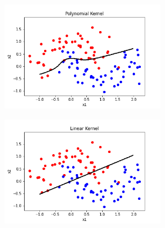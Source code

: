 \documentclass{beamer}
\begin{document}
\begin{frame}
\begin{columns}
\begin{column}{0.5\textwidth}
\begin{figure}
				\label{fig:reg-C}
			\end{figure}
		\end{column}
		\begin{column}{0.5\textwidth}
			\begin{figure}
				\centering
				\begin{subfigure}[h!]{1\textwidth}
					\centering
					\includegraphics[width=\linewidth]{fig10.png}
					\label{fig:svc-poly}
				\end{subfigure}
				\begin{subfigure}[h!]{1\textwidth}
					\centering
					\includegraphics[width=\linewidth]{fig11.png}
					\label{fig:svc-linear}
				\end{subfigure}
				\label{fig:kernel}
			\end{figure}
		\end{column}
	\end{columns}
	


\end{frame}
\end{document}
